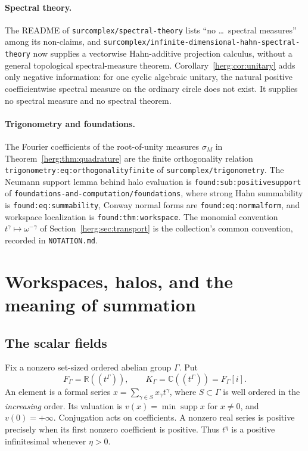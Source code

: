 \documentclass[11pt,letterpaper]{article}
\theoremstyle{definition}
\newcommand{\R}{\mathbb R}\newcommand{\C}{\mathbb C}
\newcommand{\FG}{F_\Gamma}\newcommand{\KG}{K_\Gamma}
\newcommand{\supp}{\operatorname{supp}}
\newcommand{\repo}[1]{\nolinkurl{#1}}%
\newcommand{\lbl}[1]{\nolinkurl{#1}}%
\numberwithin{equation}{section}
\begin{document}
\paragraph{Spectral theory.}
The README of \repo{surcomplex/spectral-theory} lists ``no \dots\ spectral measures'' among its non-claims, and \repo{surcomplex/infinite-dimensional-hahn-spectral-theory} now supplies a vectorwise Hahn-additive projection calculus, without a general topological spectral-measure theorem. Corollary~\ref{herg:cor:unitary} adds only negative information: for one cyclic algebraic unitary, the natural positive coefficientwise spectral measure on the ordinary circle does not exist. It supplies no spectral measure and no spectral theorem.

\paragraph{Trigonometry and foundations.}
The Fourier coefficients of the root-of-unity measures $\sigma_M$ in Theorem~\ref{herg:thm:quadrature} are the finite orthogonality relation \lbl{trigonometry:eq:orthogonalityfinite} of \repo{surcomplex/trigonometry}. The Neumann support lemma behind halo evaluation is \lbl{found:sub:positivesupport} of \repo{foundations-and-computation/foundations}, where strong Hahn summability is \lbl{found:eq:summability}, Conway normal forms are \lbl{found:eq:normalform}, and workspace localization is \lbl{found:thm:workspace}. The monomial convention $t^\gamma\mapsto\omega^{-\gamma}$ of Section~\ref{herg:sec:transport} is the collection's common convention, recorded in \repo{NOTATION.md}.

\section{Workspaces, halos, and the meaning of summation}
\label{herg:sec:framework}

\subsection{The scalar fields}

Fix a nonzero set-sized ordered abelian group $\Gamma$. Put
\begin{equation}\label{herg:eq:fields}
 \FG=\R((t^\Gamma)),\qquad
 \KG=\C((t^\Gamma))=\FG[i].
\end{equation}
An element is a formal series $x=\sum_{\gamma\in S}x_\gamma t^\gamma$, where $S\subset\Gamma$ is well ordered in the \emph{increasing} order. Its valuation is $v(x)=\min\supp x$ for $x\ne0$, and $v(0)=+\infty$. Conjugation acts on coefficients. A nonzero real series is positive precisely when its first nonzero coefficient is positive. Thus $t^\eta$ is a positive infinitesimal whenever $\eta>0$.
\end{document}
